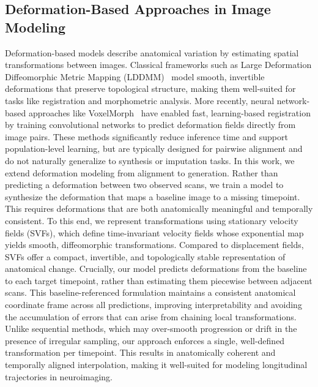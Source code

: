 \subsection{Deformation-Based Approaches in Image Modeling}

Deformation-based models describe anatomical variation by estimating spatial transformations between images. Classical frameworks such as Large Deformation Diffeomorphic Metric Mapping (LDDMM)~\cite{beg2005lddmm} model smooth, invertible deformations that preserve topological structure, making them well-suited for tasks like registration and morphometric analysis. More recently, neural network-based approaches like VoxelMorph~\cite{balakrishnan2019voxelmorph,dalca2018unsupervised} have enabled fast, learning-based registration by training convolutional networks to predict deformation fields directly from image pairs. These methods significantly reduce inference time and support population-level learning, but are typically designed for pairwise alignment and do not naturally generalize to synthesis or imputation tasks. In this work, we extend deformation modeling from alignment to generation. Rather than predicting a deformation between two observed scans, we train a model to synthesize the deformation that maps a baseline image to a missing timepoint. This requires deformations that are both anatomically meaningful and temporally consistent. To this end, we represent transformations using stationary velocity fields (SVFs), which define time-invariant velocity fields whose exponential map yields smooth, diffeomorphic transformations. Compared to displacement fields, SVFs offer a compact, invertible, and topologically stable representation of anatomical change. Crucially, our model predicts deformations from the baseline to each target timepoint, rather than estimating them piecewise between adjacent scans. This baseline-referenced formulation maintains a consistent anatomical coordinate frame across all predictions, improving interpretability and avoiding the accumulation of errors that can arise from chaining local transformations. Unlike sequential methods, which may over-smooth progression or drift in the presence of irregular sampling, our approach enforces a single, well-defined transformation per timepoint. This results in anatomically coherent and temporally aligned interpolation, making it well-suited for modeling longitudinal trajectories in neuroimaging.




